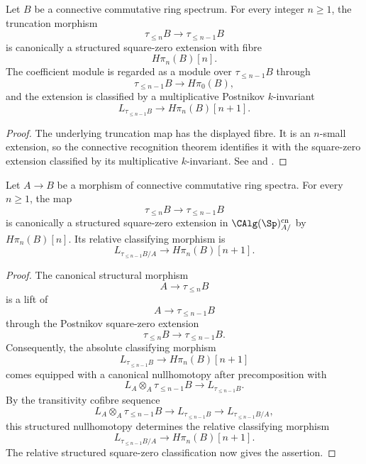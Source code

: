 \begin{theorem}
\label{thm:postnikov-square-zero}
Let $B$ be a connective commutative ring spectrum. For every integer
$n\geq1$, the truncation morphism
\[
    \tau_{\leq n}B
    \longrightarrow
    \tau_{\leq n-1}B
\]
is canonically a structured square-zero extension with fibre
\[
    H\pi_n(B)[n].
\]
The coefficient module is regarded as a module over
$\tau_{\leq n-1}B$ through
\[
    \tau_{\leq n-1}B
    \longrightarrow
    H\pi_0(B),
\]
and the extension is classified by a multiplicative Postnikov
$k$-invariant
\[
    L_{\tau_{\leq n-1}B}
    \longrightarrow
    H\pi_n(B)[n+1].
\]
\end{theorem}

\begin{proof}
The underlying truncation map has the displayed fibre. It is an
$n$-small extension, so the connective recognition theorem identifies it
with the square-zero extension classified by its multiplicative
$k$-invariant. See
\cite[Corollary~3.19]{LurieDAGIV} and
\cite[Corollary~7.4.1.28]{LurieHigherAlgebra}.
\end{proof}

\begin{corollary}
\label{cor:relative-postnikov-square-zero}
Let $A\to B$ be a morphism of connective commutative ring spectra. For
every $n\geq1$, the map
\[
    \tau_{\leq n}B
    \longrightarrow
    \tau_{\leq n-1}B
\]
is canonically a structured square-zero extension in
$\CAlg(\Sp)^{\mathrm{cn}}_{A/}$ by $H\pi_n(B)[n]$. Its relative
classifying morphism is
\[
    L_{\tau_{\leq n-1}B/A}
    \longrightarrow
    H\pi_n(B)[n+1].
\]
\end{corollary}

\begin{proof}
The canonical structural morphism
\[
    A
    \longrightarrow
    \tau_{\leq n}B
\]
is a lift of
\[
    A
    \longrightarrow
    \tau_{\leq n-1}B
\]
through the Postnikov square-zero extension
\[
    \tau_{\leq n}B
    \longrightarrow
    \tau_{\leq n-1}B.
\]
Consequently, the absolute classifying morphism
\[
    L_{\tau_{\leq n-1}B}
    \longrightarrow
    H\pi_n(B)[n+1]
\]
comes equipped with a canonical nullhomotopy after precomposition with
\[
    L_A\otimes_A\tau_{\leq n-1}B
    \longrightarrow
    L_{\tau_{\leq n-1}B}.
\]
By the transitivity cofibre sequence
\[
    L_A\otimes_A\tau_{\leq n-1}B
    \longrightarrow
    L_{\tau_{\leq n-1}B}
    \longrightarrow
    L_{\tau_{\leq n-1}B/A},
\]
this structured nullhomotopy determines the relative classifying
morphism
\[
    L_{\tau_{\leq n-1}B/A}
    \longrightarrow
    H\pi_n(B)[n+1].
\]
The relative structured square-zero classification now gives the
assertion.
\end{proof}

